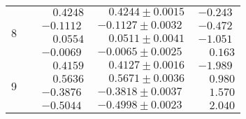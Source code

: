 \begin{table}[htbp]
\begin{center}
\begin{tabular}{l|c|c|c|c}
\hline													
													
 \multirow{4}{*}{8}	&	\ACPL 	&$	\phantom{-}0.4248	$&$	\phantom{-}0.4244		\pm		0.0015	$&$	-0.243	 $\\
	&	\ACPS 	&$	-0.1112	$&$	-0.1127		\pm		0.0032	$&$	-0.472	 $\\
	&	\ACPpa 	&$	\phantom{-}0.0554	$&$	\phantom{-}0.0511		\pm		0.0041	$&$	-1.051	 $\\
	&	\ACPpe 	&$	-0.0069	$&$	-0.0065		\pm		0.0025	$&$	\phantom{-}0.163	 $\\
													
\hline													
													
 \multirow{4}{*}{9}	&	\ACPL 	&$	\phantom{-}0.4159	$&$	\phantom{-}0.4127		\pm		0.0016	$&$	-1.989	 $\\
	&	\ACPS 	&$	\phantom{-}0.5636	$&$	\phantom{-}0.5671		\pm		0.0036	$&$	\phantom{-}0.980	 $\\
	&	\ACPpa 	&$	-0.3876	$&$	-0.3818		\pm		0.0037	$&$	\phantom{-}1.570	 $\\
	&	\ACPpe 	&$	-0.5044	$&$	-0.4998		\pm		0.0023	$&$	\phantom{-}2.040	 $\\

 \end{tabular}
\vspace{-20pt}
\end{center}
\end{table}
